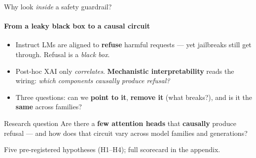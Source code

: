 \documentclass[aspectratio=169]{beamer}
\newcommand{\hl}[1]{\textcolor{themeblue}{\textbf{#1}}}
\newcommand{\hlo}[1]{\textcolor{themeorange!75!black}{\textbf{#1}}}
\begin{document}
\begin{frame}{Why look \emph{inside} a safety guardrail?}
  \framesubtitle{From a leaky black box to a causal circuit}
  \begin{itemize}
    \item Instruct LMs are aligned to \hl{refuse} harmful requests --- yet jailbreaks still get through. Refusal is a \emph{black box}.
    \item Post-hoc XAI only \emph{correlates}. \hl{Mechanistic interpretability} reads the wiring: \emph{which components causally produce refusal?}
    \item Three questions: can we \hlo{point to it}, \hlo{remove it} (what breaks?), and is it the \hlo{same} across families?
  \end{itemize}
  \vspace{4pt}
  \begin{block}{Research question}
    Are there a \hl{few attention heads} that \hl{causally} produce refusal --- and how does that circuit vary across model families and generations?
  \end{block}
  \vspace{2pt}
  {\footnotesize Five pre-registered hypotheses (H1--H4); full scorecard in the appendix.}
\end{frame}
\end{document}
